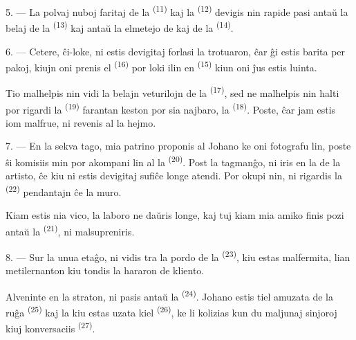 5. --- La polvaj nuboj faritaj de la  \textsuperscript{(11)}
kaj la  \textsuperscript{(12)} devigis nin rapide pasi
antaŭ la belaj  de la 
\textsuperscript{(13)} kaj antaŭ la elmetejo de  kaj
 de la  \textsuperscript{(14)}.

6. --- Cetere, ĉi-loke, ni estis devigitaj forlasi la trotuaron, ĉar ĝi estis
barita per pakoj, kiujn oni prenis el 
\textsuperscript{(16)} por loki ilin en 
\textsuperscript{(15)} kiun oni ĵus estis luinta.

Tio malhelpis nin vidi la belajn veturilojn de la 
\textsuperscript{(17)}, sed ne malhelpis nin halti por rigardi la
 \textsuperscript{(19)} farantan keston por sia najbaro, la
 \textsuperscript{(18)}. Poste,
ĉar jam estis iom malfrue, ni revenis al la hejmo.

\VUsaut{3.0mm}

7. --- En la sekva tago, mia patrino proponis al Johano ke oni fotografu lin,
poste ŝi komisiis min por akompani lin al la 
\textsuperscript{(20)}. Post la tagmanĝo, ni iris en la  de la
artisto, ĉe kiu ni estis devigitaj sufiĉe longe atendi. Por okupi nin, ni
rigardis la  \textsuperscript{(22)} pendantajn ĉe la muro.

Kiam estis nia vico, la laboro ne daŭris longe, kaj tuj kiam mia amiko finis
pozi antaŭ la  \textsuperscript{(21)}, ni malsupreniris.

8. --- Sur la unua etaĝo, ni vidis tra la pordo de la 
\textsuperscript{(23)}, kiu estas malfermita, lian metilernanton kiu tondis la
hararon de kliento.

Alveninte en la straton, ni pasis antaŭ la 
\textsuperscript{(24)}. Johano estis tiel amuzata de la ruĝa 
\textsuperscript{(25)} kaj la  kiu estas uzata kiel
 \textsuperscript{(26)}, ke li kolizias kun du maljunaj sinjoroj
kiuj konversaciis  \textsuperscript{(27)}.

\VUsaut{3.0mm}

